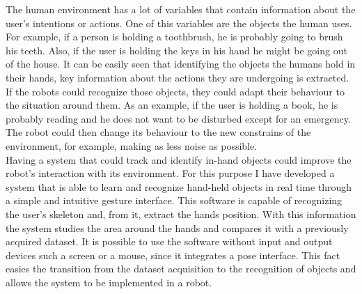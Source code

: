 The human environment has a lot of variables that contain information about the user's intentions or actions. 
One of this variables are the objects the human uses. 
For example, if a person is holding a toothbrush, he is probably going to brush his teeth. 
Also, if the user is holding the keys in his hand he might be going out of the house. 
It can be easily seen that identifying the objects the humans hold in their hands, key information about the actions they are undergoing is extracted. 
If the robots could recognize those objects, they could adapt their behaviour to the situation around them. 
As an example, if the user is holding a book, he is probably reading and  he does not want to be disturbed except for an emergency. 
The robot could then change its behaviour to the new constrains of the environment, for example, making as less noise as possible. 
\\

Having a system that could track and identify in-hand objects could improve the robot's interaction with its environment.
For this purpose I have developed a system that is able to learn and recognize hand-held objects in real time through a simple and intuitive gesture interface. 
This software is capable of recognizing the user's skeleton and, from it, extract the hands position. 
With this information the system studies the area around the hands and compares it with a previously acquired dataset.
It is possible to use the software without input and output devices such a screen or a mouse, since it integrates a pose interface. 
This fact easies the transition from the dataset acquisition to the recognition of objects and allows the system to be implemented in a robot. 









